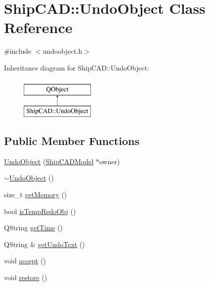 \hypertarget{classShipCAD_1_1UndoObject}{\section{Ship\-C\-A\-D\-:\-:Undo\-Object Class Reference}
\label{classShipCAD_1_1UndoObject}
}


{\ttfamily \#include $<$undoobject.\-h$>$}

Inheritance diagram for Ship\-C\-A\-D\-:\-:Undo\-Object\-:\begin{figure}[H]
\begin{center}
\leavevmode
\includegraphics[height=2.000000cm]{classShipCAD_1_1UndoObject}
\end{center}
\end{figure}
\subsection*{Public Member Functions}
\begin{DoxyCompactItemize}
\item 
\hyperlink{classShipCAD_1_1UndoObject_a7e10bcda08f733484069f9ed44345752}{Undo\-Object} (\hyperlink{classShipCAD_1_1ShipCADModel}{Ship\-C\-A\-D\-Model} $\ast$owner)
\item 
\hyperlink{classShipCAD_1_1UndoObject_abfeebd1cd99df71bea798fafe15c474f}{$\sim$\-Undo\-Object} ()
\item 
size\-\_\-t \hyperlink{classShipCAD_1_1UndoObject_a74cc90d84599a153a37e13ab35018ff6}{get\-Memory} ()
\item 
bool \hyperlink{classShipCAD_1_1UndoObject_a9f949591bc4031ed4af67ce493e42d2e}{is\-Temp\-Redo\-Obj} ()
\item 
Q\-String \hyperlink{classShipCAD_1_1UndoObject_a6d71ab49eb2b14834a0263a4292fb851}{get\-Time} ()
\item 
Q\-String \& \hyperlink{classShipCAD_1_1UndoObject_abc895eabc12ece513bd763551f505a2e}{get\-Undo\-Text} ()
\item 
void \hyperlink{classShipCAD_1_1UndoObject_a93bad349f284a0ff1cece56aa931f9e3}{accept} ()
\item 
void \hyperlink{classShipCAD_1_1UndoObject_a9cace556c2092492f681654d72e35ba6}{restore} ()
\end{DoxyCompactItemize}


